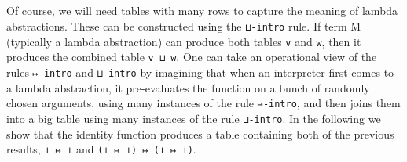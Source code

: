 \begin{fence}
\begin{code}%
\>[0]\AgdaSpace{}%
\AgdaSymbol{:}\AgdaSpace{}%
\AgdaSpace{}%
\AgdaSymbol{\{}\AgdaSymbol{\}}\AgdaSpace{}%
\AgdaSpace{}%
\AgdaSpace{}%
\AgdaSpace{}%
\AgdaSpace{}%
\AgdaSpace{}%
\AgdaSpace{}%
\AgdaSpace{}%
\<%
\\
\>[0]\AgdaSpace{}%
\AgdaSymbol{=}\AgdaSpace{}%
\AgdaSpace{}%
\<%
\\
%
\\[\AgdaEmptyExtraSkip]%
\>[0]\AgdaSpace{}%
\AgdaSymbol{:}\AgdaSpace{}%
\AgdaSpace{}%
\AgdaSymbol{\{}\AgdaSymbol{\}}\AgdaSpace{}%
\AgdaSpace{}%
\AgdaSpace{}%
\AgdaSpace{}%
\AgdaSpace{}%
\AgdaSpace{}%
\AgdaSymbol{(}\AgdaSpace{}%
\AgdaSpace{}%
\AgdaSymbol{)}\AgdaSpace{}%
\AgdaSpace{}%
\AgdaSymbol{(}\AgdaSpace{}%
\AgdaSpace{}%
\AgdaSymbol{)}\<%
\\
\>[0]\AgdaSpace{}%
\AgdaSymbol{=}\AgdaSpace{}%
\AgdaSpace{}%
\<%
\end{code}
\end{fence}

Of course, we will need tables with many rows to capture the meaning of
lambda abstractions. These can be constructed using the \texttt{⊔-intro}
rule. If term M (typically a lambda abstraction) can produce both tables
\texttt{v} and \texttt{w}, then it produces the combined table
\texttt{v\ ⊔\ w}. One can take an operational view of the rules
\texttt{↦-intro} and \texttt{⊔-intro} by imagining that when an
interpreter first comes to a lambda abstraction, it pre-evaluates the
function on a bunch of randomly chosen arguments, using many instances
of the rule \texttt{↦-intro}, and then joins them into a big table using
many instances of the rule \texttt{⊔-intro}. In the following we show
that the identity function produces a table containing both of the
previous results, \texttt{⊥\ ↦\ ⊥} and \texttt{(⊥\ ↦\ ⊥)\ ↦\ (⊥\ ↦\ ⊥)}.

